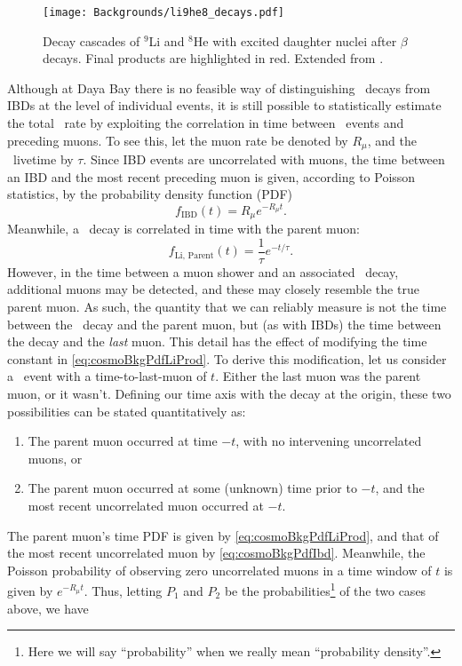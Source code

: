 \documentclass[../thesis.tex]{subfiles}
\begin{document}
\begin{figure}[h]
  \texttt{[image: Backgrounds/li9he8\_decays.pdf]}
  \caption{Decay cascades of $^9$Li and $^8$He with excited daughter nuclei after $\beta$ decays. Final products are highlighted in red. Extended from \cite{pedroLi9Spec2}.}
  \label{fig:li9he8_decays}
\end{figure}

Although at Daya Bay there is no feasible way of distinguishing \linine\ decays from IBDs at the level of individual events, it is still possible to statistically estimate the total \linine\ rate by exploiting the correlation in time between \linine\ events and preceding muons. To see this, let the muon rate be denoted by $R_\mu$, and the \linine\ livetime by $\tau$. Since IBD events are uncorrelated with muons, the time between an IBD and the most recent preceding muon is given, according to Poisson statistics, by the probability density function (PDF)
\begin{equation}
  \label{eq:cosmoBkgPdfIbd}
  f_{\mathrm{IBD}}(t) = R_\mu e^{-R_\mu t}.
\end{equation}
Meanwhile, a \linine\ decay is correlated in time with the parent muon:
\begin{equation}
  \label{eq:cosmoBkgPdfLiProd}
  f_{\mathrm{Li,\,Parent}}(t) = \frac{1}{\tau} e^{-t/\tau}.
\end{equation}
However, in the time between a muon shower and an associated \linine\ decay, additional muons may be detected, and these may closely resemble the true parent muon. As such, the quantity that we can reliably measure is not the time between the \linine\ decay and the parent muon, but (as with IBDs) the time between the decay and the \emph{last} muon. This detail has the effect of modifying the time constant in \autoref{eq:cosmoBkgPdfLiProd}. To derive this modification, let us consider a \linine\ event with a time-to-last-muon of $t$. Either the last muon was the parent muon, or it wasn't. Defining our time axis with the decay at the origin, these two possibilities can be stated quantitatively as:
\begin{enumerate}
\item The parent muon occurred at time $-t$, with no intervening uncorrelated muons, or
\item The parent muon occurred at some (unknown) time prior to $-t$, and the most recent uncorrelated muon occurred at $-t$.
\end{enumerate}
The parent muon's time PDF is given by \autoref{eq:cosmoBkgPdfLiProd}, and that of the most recent uncorrelated muon by \autoref{eq:cosmoBkgPdfIbd}. Meanwhile, the Poisson probability of observing zero uncorrelated muons in a time window of $t$ is given by $e^{-R_\mu t}$. Thus, letting $P_1$ and $P_2$ be the probabilities\footnote{Here we will say ``probability'' when we really mean ``probability density''.} of the two cases above, we have
\end{document}

